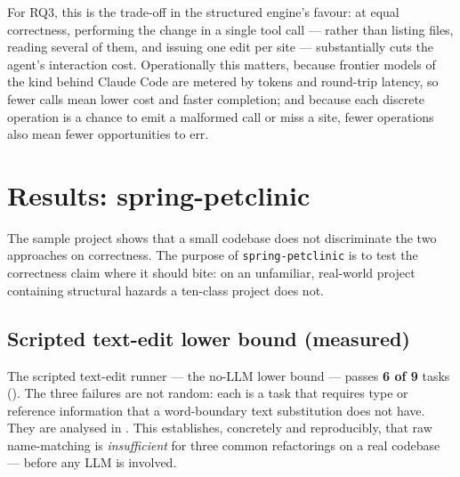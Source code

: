 For RQ3, this is the trade-off in the structured engine's favour: at equal correctness,
performing the change in a single tool call --- rather than listing files, reading
several of them, and issuing one edit per site --- substantially cuts the agent's
interaction cost. Operationally this matters, because frontier models of the kind behind
Claude Code are metered by tokens and round-trip latency, so fewer calls mean lower cost
and faster completion; and because each discrete operation is a chance to emit a
malformed call or miss a site, fewer operations also mean fewer opportunities to err.

\section{Results: spring-petclinic}
\label{sec:eval-petclinic}
The sample project shows that a small codebase does not discriminate the two
approaches on correctness. The purpose of \texttt{spring-petclinic} is to test
the correctness claim where it should bite: on an unfamiliar, real-world project
containing structural hazards a ten-class project does not.

\subsection{Scripted text-edit lower bound (measured)}
The scripted text-edit runner --- the no-LLM lower bound --- passes
\textbf{6 of 9} tasks (). The three failures are not random:
each is a task that requires type or reference information that a word-boundary
text substitution does not have. They are analysed in .
This establishes, concretely and reproducibly, that raw name-matching is
\emph{insufficient} for three common refactorings on a real codebase --- before
any LLM is involved.

